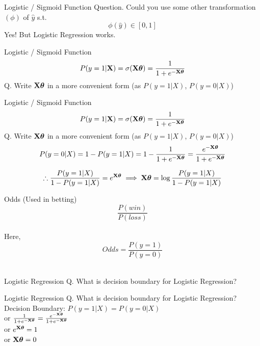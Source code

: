 \documentclass{beamer}
\begin{document}
\begin{frame}{Logistic / Sigmoid Function}
Question. Could you use some other transformation $(\phi)$ of $\hat{y}$ s.t. \\
\begin{equation*}
\phi(\hat{y}) \in [0, 1]
\end{equation*}
Yes! But Logistic Regression works.
\end{frame}
\begin{frame}{Logistic / Sigmoid Function}
\begin{equation*}
P(y = 1 | \mathbf{X}) = \sigma(\mathbf{X}\boldsymbol{\theta}) = \frac{1}{1 + e^{-\mathbf{X}\boldsymbol{\theta}}}    
\end{equation*}
Q. Write $\mathbf{X}\boldsymbol{\theta}$ in a more convenient form (as $P(y = 1|X)$, $P(y = 0 | X)$)\\
\end{frame}
\begin{frame}{Logistic / Sigmoid Function}
\begin{equation*}
P(y = 1 | \mathbf{X}) = \sigma(\mathbf{X}\boldsymbol{\theta}) = \frac{1}{1 + e^{-\mathbf{X}\boldsymbol{\theta}}}    
\end{equation*}
Q. Write $\mathbf{X}\boldsymbol{\theta}$ in a more convenient form (as $P(y = 1|X)$, $P(y = 0 | X)$)\\
\pause \begin{equation*}
P(y = 0 | X) = 1 - P(y = 1 | X) = 1 - \frac{1}{1 + e^{-\mathbf{X}\boldsymbol{\theta}}} = \frac{e^{-\mathbf{X}\boldsymbol{\theta}}}{1 + e^{-\mathbf{X}\boldsymbol{\theta}}} 
\end{equation*}

\pause \begin{equation*}
\therefore \frac{P(y = 1|X)}{1 - P(y = 1|X)} = e^{\mathbf{X}\boldsymbol{\theta}}
\implies \mathbf{X}\boldsymbol{\theta} = \log\frac{P(y = 1|X)}{1 - P(y = 1 | X)}
\end{equation*}
\end{frame}
\begin{frame}{Odds (Used in betting)}
$$\frac{P(win)}{P(loss)}$$ \\
\hspace{3cm} Here,\\
$$Odds = \frac{P(y = 1)}{P(y = 0)}$$ \\
\centering
{}
\end{frame}
\begin{frame}{Logistic Regression}
Q. What is decision boundary for Logistic Regression?
\end{frame}
\begin{frame}{Logistic Regression}
Q. What is decision boundary for Logistic Regression? \\
\hspace{0.4cm} Decision Boundary: $P(y = 1|X) = P(y = 0 | X)$\\
\vspace{0.3cm}
\hspace{4cm} or $\frac{1}{1 + e^{-\mathbf{X}\boldsymbol{\theta}}} = \frac{e^{-\mathbf{X}\boldsymbol{\theta}}}{1 + e^{-\mathbf{X}\boldsymbol{\theta}}}$  \\
\vspace{0.3cm}
\hspace{4cm} or $e^{\mathbf{X}\boldsymbol{\theta}} = 1$\\
\vspace{0.3cm}
\hspace{4cm} or $\mathbf{X}\boldsymbol{\theta} = 0$
\end{frame}
\end{document}
